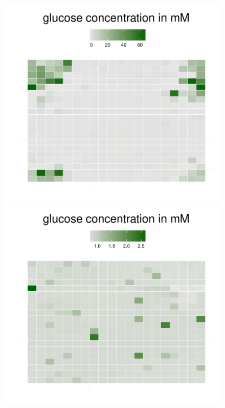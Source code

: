 \begin{figure}[h]
{\begin{minipage}[t]{0.3\textwidth}
  \end{minipage}
  \begin{minipage}[t]{0.3\textwidth}
    \includegraphics[width=\textwidth]{../results/ecoli_20x20_aerob_seed55_gluc35.pdf}
  \end{minipage}
  \begin{minipage}[t]{0.3\textwidth}
    \includegraphics[width=\textwidth]{../results/ecoli_20x20_aerob_seed55_gluc50.pdf}

\end{minipage}}
\end{figure}
